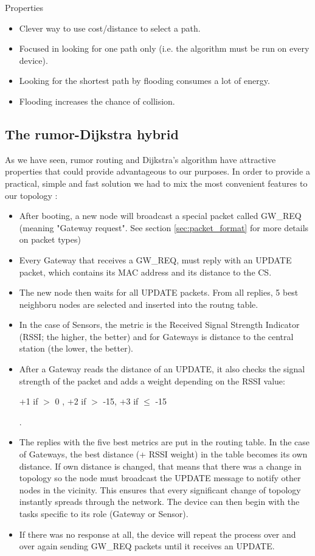 \noindent Properties
\begin{itemize}[noitemsep]
	\item Clever way to use cost/distance to select a path.
	\item Focused in looking for one path only (i.e. the algorithm must be run on every device).
	\item Looking for the shortest path by flooding consumes a lot of energy.
	\item Flooding increases the chance of collision.
\end{itemize}

\subsection{The rumor-Dijkstra hybrid}
\label{sec:hybrid}
As we have seen, rumor routing and Dijkstra's algorithm have attractive properties that could provide advantageous to our purposes. 
In order to provide a practical, simple and fast solution we had to mix the most convenient features to our topology :

\begin{itemize}[noitemsep]
	\item After booting, a new node will broadcast a special packet called GW\_REQ (meaning "Gateway request". See section \ref{sec:packet_format} for more details on packet types)
	\item Every Gateway that receives a GW\_REQ, must reply with an UPDATE packet, which contains its MAC address and its distance to the CS.
	\item The new node then waits for all UPDATE packets. From all replies, 5 best neighboru nodes are selected and inserted into the routng table.
	\item In the case of Sensors, the metric is the Received Signal Strength Indicator (RSSI; the higher, the better) and for Gateways is distance to the central station (the lower, the better).
	\item After a Gateway reads the distance of an UPDATE, it also checks the signal strength of the packet and adds a weight depending on the RSSI value:\\
			\centerline{+1 if \(>\) 0 , +2 if \(>\) -15, +3 if \(\leq\) -15}. 
	\item The replies with the five best metrics are put in the routing table. In the case of Gateways, the best distance (+ RSSI weight) in the table becomes its own distance. If own distance is changed, that means that there was a change in topology so the node must broadcast the UPDATE message to notify other nodes in the vicinity. This ensures that every significant change of topology instantly spreads through the network. 
	The device can then begin with the tasks specific to its role (Gateway or Sensor).
	\item If there was no response at all, the device will repeat the process over and over again sending GW\_REQ packets until it receives an UPDATE.
\end{itemize}

